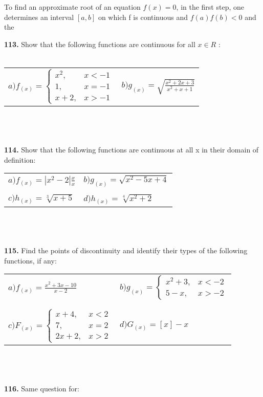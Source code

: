 \documentclass[11pt]{amsbook}
\begin{document}
 To find an approximate root of an equation $f(x) = 0$, in the first step, one determines an interval $ [a, b]$ on which f is continuous and 
$f(a) f(b)<0$ and the

\textbf{113.} Show that the following functions are continuous for all $x \in R$ :\\\\
\begin{tabular}{ll}
$a)  f_{(x)} = \left\{ 
\begin{array}{ll}
x^2, & x<-1 \\
1, & x=-1 \\
x+2, & x>-1
\end{array} 
\right.
$
& $b)  g_{(x)} = \sqrt{\frac{x^2 + 2x + 3}{x^2 + x + 1}}$
\end{tabular}
\\\\\\
\textbf{114.} Show that the following functions are continuous at all x in their domain of definition:\\


\begin{tabular}{ll}
$a)  f_{(x)} = |x^2-2| \frac{x}{x} $
& $b)  g_{(x)} = \sqrt{x^2 -5x +4}$\\\\

$c)  h_{(x)} = \sqrt[3]{x+5} $
& $d)  h_{(x)} = \sqrt[4]{x^2+2}$
\end{tabular}
\\\\\\
\textbf{115.} Find the points of discontinuity and identify their types of the following functions, if any:\\

\begin{tabular}{ll}
$a)  f_{(x)} = \frac{x^2+3x-10}{x-2}$
& 
$b)  g_{(x)} = \left\{ 
\begin{array}{ll}
x^2 +3, & x<-2 \\
5-x, & x>-2
\end{array} 
\right.$\\\\\\

$c)  F_{(x)} = \left\{ 
\begin{array}{ll}
x+4, & x<2\\
7, & x=2 \\
2x+2, & x>2
\end{array} 
\right.$
&
$d) G_{(x)}=[x]-x $
\end{tabular}
\\\\\\
\textbf{116.} Same question for:\\
\end{document}
